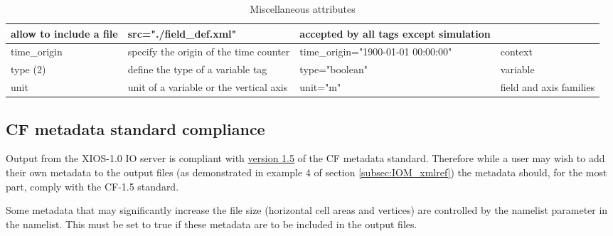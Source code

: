 \documentclass[../tex_main/NEMO_manual]{subfiles}
\begin{document}
\begin{table}
\begin{tabularx}{\textwidth}{|l|X|X|X|}
		allow to include a file                                                                              &
		src="./field\_def.xml"                                                                               &
		accepted by all tags except simulation \\ \hline
		time\_origin                                                                                         &
		specify the origin of the time counter                                                               &
		time\_origin="1900-01-01 00:00:00"                                                                   &
		context                                \\ \hline
		type (2)                                                                                             &
		define the type of a variable tag                                                                    &
		type="boolean"                                                                                       &
		variable                               \\ \hline
		unit                                                                                                 &
		unit of a variable or the vertical axis                                                              &
		unit="m"                                                                                             &
		field and axis families                \\ \hline
	\end{tabularx}
	\caption{Miscellaneous attributes}
\end{table}

\subsection{CF metadata standard compliance}

Output from the XIOS-1.0 IO server is compliant with 
\href{http://cfconventions.org/Data/cf-conventions/cf-conventions-1.5/build/cf-conventions.html}{version 1.5} of
the CF metadata standard. 
Therefore while a user may wish to add their own metadata to the output files (as demonstrated in example 4 of
section \autoref{subsec:IOM_xmlref}) the metadata should, for the most part, comply with the CF-1.5 standard.

Some metadata that may significantly increase the file size (horizontal cell areas and vertices) are controlled by
the namelist parameter  in the  namelist.
This must be set to true if these metadata are to be included in the output files.
\end{document}
